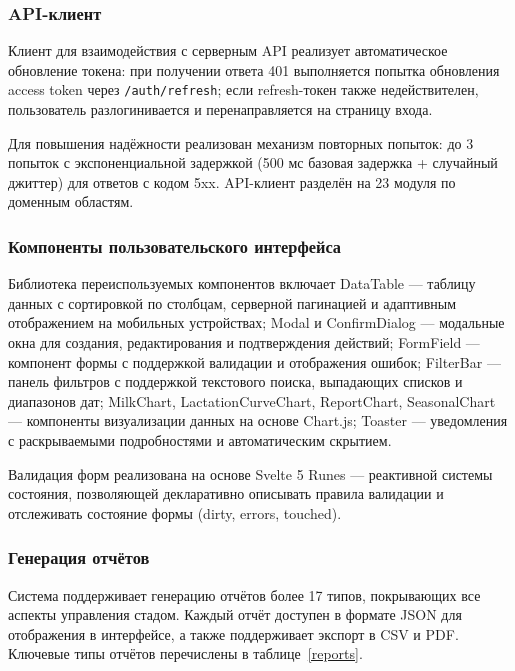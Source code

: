 \subsubsection{API-клиент}

Клиент для взаимодействия с серверным API реализует автоматическое обновление токена: при получении ответа 401 выполняется попытка обновления access token через \texttt{/auth/refresh}; если refresh-токен также недействителен, пользователь разлогинивается и перенаправляется на страницу входа.

Для повышения надёжности реализован механизм повторных попыток: до 3 попыток с экспоненциальной задержкой (500 мс базовая задержка + случайный джиттер) для ответов с кодом 5xx. API-клиент разделён на 23 модуля по доменным областям.

\subsubsection{Компоненты пользовательского интерфейса}

Библиотека переиспользуемых компонентов включает DataTable --- таблицу данных с сортировкой по столбцам, серверной пагинацией и адаптивным отображением на мобильных устройствах; Modal и ConfirmDialog --- модальные окна для создания, редактирования и подтверждения действий; FormField --- компонент формы с поддержкой валидации и отображения ошибок; FilterBar --- панель фильтров с поддержкой текстового поиска, выпадающих списков и диапазонов дат; MilkChart, LactationCurveChart, ReportChart, SeasonalChart --- компоненты визуализации данных на основе Chart.js; Toaster --- уведомления с раскрываемыми подробностями и автоматическим скрытием.

Валидация форм реализована на основе Svelte 5 Runes --- реактивной системы состояния, позволяющей декларативно описывать правила валидации и отслеживать состояние формы (dirty, errors, touched).

\subsubsection{Генерация отчётов}

Система поддерживает генерацию отчётов более 17 типов, покрывающих все аспекты управления стадом. Каждый отчёт доступен в формате JSON для отображения в интерфейсе, а также поддерживает экспорт в CSV и PDF. Ключевые типы отчётов перечислены в таблице~\ref{reports}.

